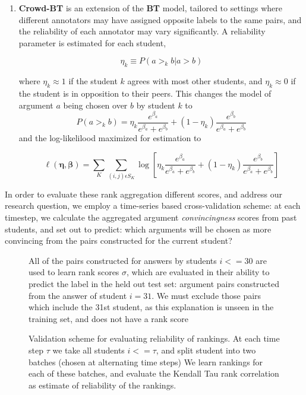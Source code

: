 \documentclass[notitlepage,12pt]{jedm}
\begin{document}
\begin{enumerate}
	\item \textbf{Crowd-BT} \cite{chen_pairwise_2013} is an extension of the 
	\textbf{BT} model, tailored to settings where different annotators may have 
	assigned opposite labels to the same pairs, and the reliability of each 
	annotator may vary significantly. 
	A reliability parameter is estimated for each student, 
	
	$$
	\eta_k \equiv P(a >_k b | a >b )
	$$
	
	where $\eta_k \approx 1$ if the student  $k$ agrees with most other 
	students, and $\eta_k \approx 0$ if the student is in opposition to their 
	peers.
	This changes the model of argument $a$ being chosen over $b$ by student $k$ 
	to 
	$$
	P(a >_k b) = 
	\eta_k \frac{e^{\beta_a}}{e^{\beta_a}+e^{\beta_b}} + (1-\eta_k) 
	\frac{e^{\beta_b}}{e^{\beta_a}+e^{\beta_b}}
	$$
	and the log-likelilood maximized for estimation to 
	
	$$
	\ell(\boldsymbol{\eta},\boldsymbol{\beta})=\sum_{K}\sum_{(i,j)\epsilon 
		S_K}^{} 
	\log \left[ \eta_k \frac{e^{\beta_a}}{e^{\beta_a}+e^{\beta_b}} + (1-\eta_k) 
	\frac{e^{\beta_b}}{e^{\beta_a}+e^{\beta_b}} \right]
	$$
	
\end{enumerate}

In order to evaluate these rank aggregation different scores, and address 
our research question, we employ a time-series based cross-validation scheme:
at each timestep, we calculate the aggregated argument \textit{convincingness} 
scores from past students, and set out to predict: which arguments will be 
chosen as more convincing from the pairs constructed for the current student?  



\begin{figure}
	\centering
	\def\svgscale{0.5}
	
	\caption{
		All of the pairs constructed for answers by students $i<=30$ are used 
		to learn rank scores $\sigma$, which are evaluated in their ability to 
		predict the label in the held out test set: argument pairs constructed 
		from the answer of student $i=31$.
		We must exclude those pairs which include the 31st student, as this 
		explanation is unseen in the training set, and does not have a rank 
		score 
	}
	\label{fig:make_pairs_time_series}
\end{figure}

\begin{figure}
	\centering
	\def\svgscale{0.5}
	
	\caption{
		Validation scheme for evaluating reliability of rankings.
		At each time step $\tau$ we take all students $i<=\tau$, and split 
		student into two batches (chosen at alternating time steps)
		We learn rankings for each of these batches, and evaluate the Kendall 
		Tau rank correlation as estimate of reliability of the rankings.
	}
	\label{fig:rank_reliability}
\end{figure}
\end{document}
